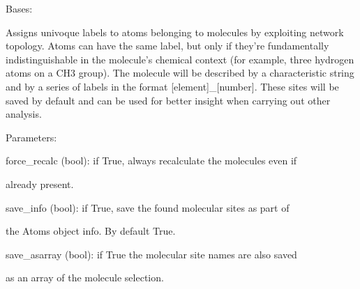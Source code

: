 \documentclass[letterpaper,10pt,english]{sphinxmanual}
\begin{document}

\begin{fulllineitems}
\label{doctree/soprano.properties.labeling.labeling:soprano.properties.labeling.labeling.MoleculeSites}
Bases: {\hyperref[doctree/soprano.properties.atomsproperty:soprano.properties.atomsproperty.AtomsProperty]{\emph{}}}

Assigns univoque labels to atoms belonging to molecules by exploiting
network topology. Atoms can have the same label, but only if they're
fundamentally indistinguishable in the molecule's chemical context
(for example, three hydrogen atoms on a CH3 group). The molecule will be
described by a characteristic string and by a series of labels in the
format {[}element{]}\_{[}number{]}. These sites will be saved by default and can
be used for better insight when carrying out other analysis.

\begin{DUlineblock}{0em}
\item[] Parameters:
\item[]
\begin{DUlineblock}{\DUlineblockindent}
\item[] force\_recalc (bool): if True, always recalculate the molecules even if
\item[]
\begin{DUlineblock}{\DUlineblockindent}
\item[] already present.
\end{DUlineblock}
\item[] save\_info (bool): if True, save the found molecular sites as part of
\item[]
\begin{DUlineblock}{\DUlineblockindent}
\item[] the Atoms object info. By default True.
\end{DUlineblock}
\item[] save\_asarray (bool): if True the molecular site names are also saved
\item[]
\begin{DUlineblock}{\DUlineblockindent}
\item[] as an array of the molecule selection.
\end{DUlineblock}
\end{DUlineblock}
\end{DUlineblock}


\end{fulllineitems}
\end{document}
